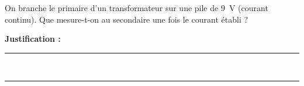 On branche le primaire d'un transformateur sur une pile de \qty{9}{V} (courant continu). Que mesure-t-on au secondaire une fois le courant établi ?

\choices

\noindent\textbf{Justification :} \hrulefill \\[2.5ex]
\rule{\linewidth}{0.4pt} \\[2.5ex]
\rule{\linewidth}{0.4pt}
\vfill
